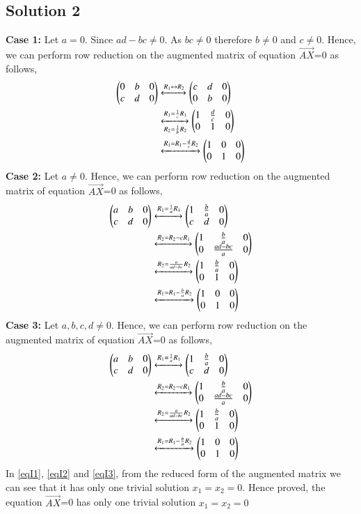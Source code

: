 \documentclass[journal,12pt,twocolumn]{IEEEtran}
\begin{document}
\subsection{Solution 2}
\textbf{Case 1: }Let $a=0$. Since $ad-bc\not=0$. As $bc\not=0$ therefore $b\not=0$ and $c\not=0$. Hence, we can perform row reduction on the augmented matrix of equation $\vec{AX}$=0 as follows,
\begin{align}
\begin{pmatrix}0&b&0\\c&d&0\end{pmatrix}&\xleftrightarrow{R_1\leftrightarrow R_2}\begin{pmatrix}c&d&0\\0&b&0\end{pmatrix}\\
&\xleftrightarrow[R_2 =\frac{1}{b}R_2]{R_1 =\frac{1}{c}R_1}\begin{pmatrix}1&\frac{d}{c}&0\\0&1&0\end{pmatrix}\\
&\xleftrightarrow{R_1=R_1 - \frac{d}{c}R_2}\begin{pmatrix}1&0&0\\0&1&0\end{pmatrix}\label{eqI1}
\end{align}
\textbf{Case 2: }Let $a\not=0$. Hence, we can perform row reduction on the augmented matrix of equation $\vec{AX}$=0 as follows,
\begin{align}
\begin{pmatrix}a&b&0\\c&d&0\end{pmatrix}&\xleftrightarrow{R_1 = \frac{1}{a}R_1}\begin{pmatrix}1&\frac{b}{a}&0\\c&d&0\end{pmatrix}\\
&\xleftrightarrow{R_2 = R_2-cR_1}\begin{pmatrix}1&\frac{b}{a}&0\\0&\frac{ad-bc}{a}&0\end{pmatrix}\\
&\xleftrightarrow{R_2=\frac{a}{ad-bc}R_2}\begin{pmatrix}1&\frac{b}{a}&0\\0&1&0\end{pmatrix}\\
&\xleftrightarrow{R_1 = R_1-\frac{b}{a}R_2}\begin{pmatrix}1&0&0\\0&1&0\end{pmatrix}\label{eqI2}
\end{align}
\textbf{Case 3: }Let $a,b,c,d \not= 0$. Hence, we can perform row reduction on the augmented matrix of equation $\vec{AX}$=0 as follows,
\begin{align}
\begin{pmatrix}a&b&0\\c&d&0\end{pmatrix}&\xleftrightarrow{R_1 = \frac{1}{a}R_1}\begin{pmatrix}1&\frac{b}{a}&0\\c&d&0\end{pmatrix}\\
&\xleftrightarrow{R_2 = R_2-cR_1}\begin{pmatrix}1&\frac{b}{a}&0\\0&\frac{ad-bc}{a}&0\end{pmatrix}\\
&\xleftrightarrow{R_2=\frac{a}{ad-bc}R_2}\begin{pmatrix}1&\frac{b}{a}&0\\0&1&0\end{pmatrix}\\
&\xleftrightarrow{R_1 = R_1-\frac{b}{a}R_2}\begin{pmatrix}1&0&0\\0&1&0\end{pmatrix}\label{eqI3}
\end{align}
In \eqref{eqI1}, \eqref{eqI2} and \eqref{eqI3}, from the reduced form of the augmented matrix we can see that it has only one trivial solution $x_1=x_2=0$. Hence proved, the equation $\vec{AX}$=0 has only one trivial solution $x_1=x_2=0$
\end{document}
